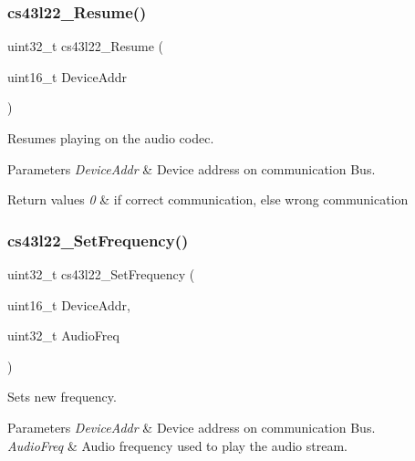 \subsubsection{\texorpdfstring{cs43l22\+\_\+\+Resume()}{cs43l22\_Resume()}}
{\footnotesize\ttfamily uint32\+\_\+t cs43l22\+\_\+\+Resume (\begin{DoxyParamCaption}\item[{uint16\+\_\+t}]{Device\+Addr }\end{DoxyParamCaption})}



Resumes playing on the audio codec. 


\begin{DoxyParams}{Parameters}
{\em Device\+Addr} & Device address on communication Bus. \\
\hline
\end{DoxyParams}

\begin{DoxyRetVals}{Return values}
{\em 0} & if correct communication, else wrong communication \\
\hline
\end{DoxyRetVals}
\mbox{\label{group___c_s43_l22___exported___functions_ga1ea4920e35f5e5f903870a50b53bc719}} 
\subsubsection{\texorpdfstring{cs43l22\+\_\+\+Set\+Frequency()}{cs43l22\_SetFrequency()}}
{\footnotesize\ttfamily uint32\+\_\+t cs43l22\+\_\+\+Set\+Frequency (\begin{DoxyParamCaption}\item[{uint16\+\_\+t}]{Device\+Addr,  }\item[{uint32\+\_\+t}]{Audio\+Freq }\end{DoxyParamCaption})}



Sets new frequency. 


\begin{DoxyParams}{Parameters}
{\em Device\+Addr} & Device address on communication Bus. ~\newline
\\
\hline
{\em Audio\+Freq} & Audio frequency used to play the audio stream. \\
\hline
\end{DoxyParams}

